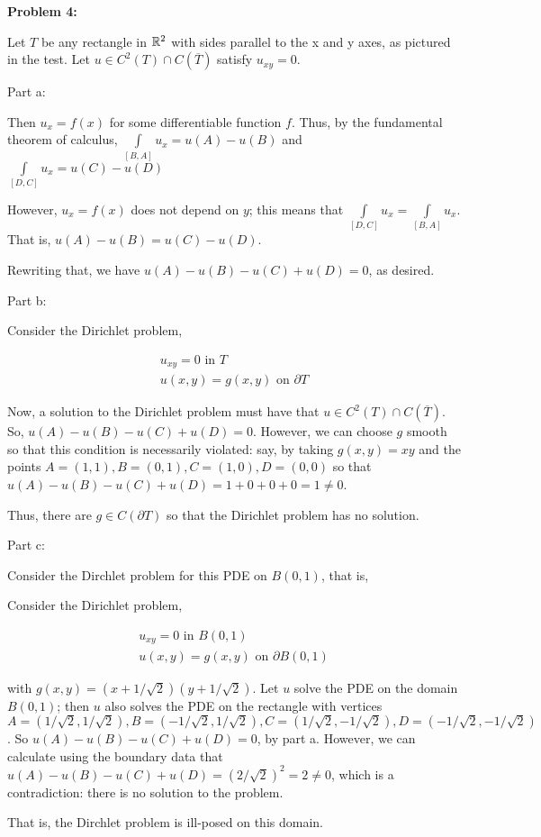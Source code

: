 \documentclass[a4paper,12pt]{article}
\begin{document}
\shunt

{\bf Problem 4:}

Let $T$ be any rectangle in $\mathbb{R}^2$ with sides parallel to the x and y axes, as pictured in the test. Let $u \in C^2(T) \cap C(\overline{T})$ satisfy $u_{xy} = 0$.

Part a:

Then $u_x = f(x)$ for some differentiable function $f$. Thus, by the fundamental theorem of calculus, $\int\limits_{[B,A]} u_x = u(A) - u(B)$ and $\int\limits_{[D,C]} u_x = u(C) - u(D)$

However, $u_x = f(x)$ does not depend on $y$; this means that $\int\limits_{[D,C]} u_x = \int\limits_{[B,A]} u_x$. That is, $u(A) - u(B) = u(C) - u(D)$.

Rewriting that, we have $u(A) - u(B) - u(C) + u(D) = 0$, as desired.

\shunt

Part b:

Consider the Dirichlet problem,

\begin{align*}
u_{xy} = 0 \text{ in } T\\
u(x,y) = g(x,y) \text { on } \partial T
\end{align*}

Now, a solution to the Dirichlet problem must have that $u \in C^2(T) \cap C(\overline{T})$. So, $u(A) - u(B) - u(C) + u(D) = 0$. However, we can choose $g$ smooth so that this condition is necessarily violated: say, by taking $g(x,y) = xy$ and the points $A=(1,1), B=(0,1), C = (1,0), D= (0,0)$ so that $u(A) - u(B) - u(C) + u(D) = 1+0+0+0=1 \neq 0$. 

Thus, there are $g \in C(\partial T)$ so that the Dirichlet problem has no solution. 

\shunt

Part c:

Consider the Dirchlet problem for this PDE on $B(0,1)$, that is,

Consider the Dirichlet problem,

\begin{align*}
u_{xy} = 0 \text{ in } B(0,1)\\
u(x,y) = g(x,y) \text { on } \partial B(0,1)
\end{align*}

with $g(x,y) = (x+1/\sqrt{2})(y+1/\sqrt{2})$. Let $u$ solve the PDE on the domain $B(0,1)$; then $u$ also solves the PDE on the rectangle with vertices $A=(1/\sqrt{2},1/\sqrt{2}), B=(-1/\sqrt{2},1/\sqrt{2}), C=(1/\sqrt{2},-1/\sqrt{2}), D=(-1/\sqrt{2},-1/\sqrt{2})$. So $u(A) - u(B) - u(C) + u(D) = 0$, by part a. However, we can calculate using the boundary data that $u(A) - u(B) - u(C) + u(D) = (2/\sqrt{2})^2 = 2 \neq 0$, which is a contradiction: there is no solution to the problem. 

That is, the Dirchlet problem is ill-posed on this domain. 

\shunt
\end{document}
